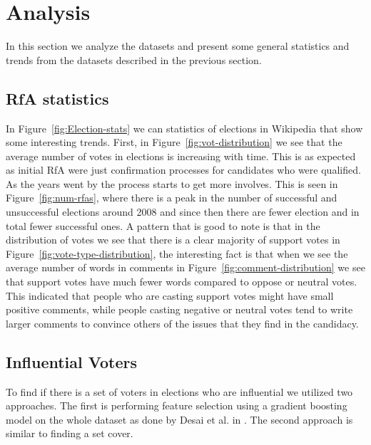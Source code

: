 \section{Analysis}
In this section we analyze the datasets and present some general statistics and trends from the datasets described in the previous section.

\subsection{RfA statistics}
In Figure~\ref{fig:Election-stats} we can statistics of elections in Wikipedia that show some interesting trends. First, in Figure~\ref{fig:vot-distribution} we see that the average number of votes in elections is increasing with time. This is as expected as initial RfA were just confirmation processes for candidates who were qualified. As the years went by the process starts to get more involves. This is seen in Figure~\ref{fig:num-rfas}, where there is a peak in the number of successful and unsuccessful elections around 2008 and since then there are fewer election and in total fewer successful ones. A pattern that is good to note is that in the distribution of votes we see that there is a clear majority of support votes in Figure~\ref{fig:vote-type-distribution}, the interesting fact is that when we see the average number of words in comments in Figure~\ref{fig:comment-distribution} we see that support votes have much fewer words compared to oppose or neutral votes. This indicated that people who are casting support votes might have small positive comments, while people casting negative or neutral votes tend to write larger comments to convince others of the issues that they find in the candidacy.

\subsection{Influential Voters}
To find if there is a set of voters in elections who are influential we utilized two approaches. The first is performing feature selection using a gradient boosting model on the whole dataset as done by Desai et al. in \cite{desai2014result}. The second approach is similar to finding a set cover.
\smallskip

